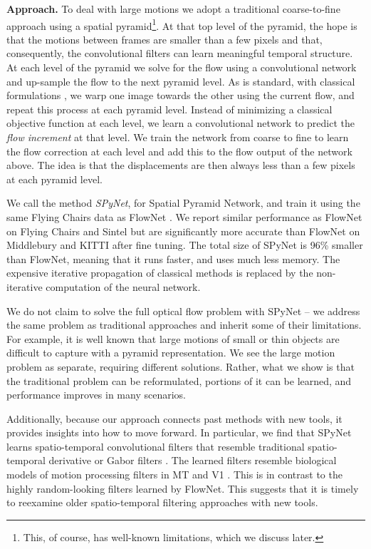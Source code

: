 \documentclass[10pt,twocolumn,letterpaper]{article}
\newcommand\myworries[1]{\textcolor{red}{#1}}
\begin{document}
{\bf Approach.}
To deal with large motions we adopt a traditional coarse-to-fine approach using a spatial pyramid\footnote{This, of course, has well-known limitations, which we discuss later.}.
At that top level of the pyramid, the hope is that the motions between frames are smaller than a few pixels and that, consequently, the convolutional filters can learn meaningful temporal structure.
At each level of the pyramid we solve for the flow using a convolutional network and
up-sample the flow to the next pyramid level.
As is standard, with classical formulations \cite{sun2014quantitative},
we warp one image towards the other using the current flow, and repeat this process at each pyramid level.
Instead of minimizing a classical objective function at each level, we learn a convolutional network to predict the {\em flow increment} at that level.
We train the network from coarse to fine to learn the flow correction at each level and add this to the flow output of the network above.
The idea is that the displacements are then always less than a few pixels at each pyramid level.

We call the method {\em SPyNet}, for Spatial Pyramid Network, and train it using the same Flying Chairs data as FlowNet \cite{dosovitskiy2015flownet}.
We report similar performance as FlowNet on Flying Chairs and Sintel \cite{Butler:ECCV:2012} but are  %
significantly more accurate than FlowNet on Middlebury \cite{baker2011database} and KITTI \cite{Geiger2012CVPR} after fine tuning.
The total size of SPyNet is 96\% smaller than FlowNet, meaning that it runs faster, and uses much less memory.
The expensive iterative propagation of classical methods is replaced by the non-iterative computation of the neural network.

We do not claim to solve the full optical flow problem with SPyNet -- we address the same problem as traditional approaches and inherit some of their limitations.  
For example, it is well known that large motions of small or thin objects are difficult to capture with a pyramid representation.  
We see the large motion problem as separate, requiring different solutions.
Rather, what we show is that the traditional problem can be reformulated, portions of it can be learned, and performance improves in many scenarios.

Additionally, because our approach connects past methods with new tools, it provides insights into how to move forward.
In particular, we find that SPyNet learns spatio-temporal convolutional filters that resemble traditional spatio-temporal derivative or Gabor filters \cite{adelson1985spatiotemporal,heeger1987model}.
The learned filters resemble biological models of motion processing filters in MT and V1 
\cite{Simoncelli1998}. %
This is in contrast to the highly random-looking filters learned by FlowNet.
This suggests that it is timely to reexamine older spatio-temporal filtering approaches with new tools.
\end{document}
